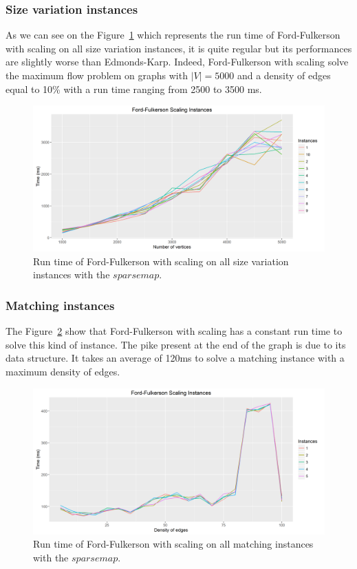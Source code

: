 \subsubsection{Size variation instances}
As we can see on the Figure~\ref{fig:FFmeansize} which represents the run time of Ford-Fulkerson with scaling on all size variation instances, it is quite regular but its performances are slightly worse than Edmonds-Karp. Indeed, Ford-Fulkerson with scaling solve the maximum flow problem on graphs with $|V|=5000$ and a density of edges equal to 10\% with a run time ranging from 2500 to 3500 ms.
\begin{figure}[H]
\begin{center}
\includegraphics[scale=0.5]{images/FFmeansize.png}
\caption{Run time of Ford-Fulkerson with scaling on all size variation instances with the $sparse map$.}
\label{fig:FFmeansize}
\end{center}
\end{figure}
\subsubsection{Matching instances}
The Figure~\ref{fig:ffmatching} show that Ford-Fulkerson with scaling has a constant run time to solve this kind of instance. The pike present at the end of the graph is due to its data structure. It takes an average of 120ms to solve a matching instance with a maximum density of edges.
\begin{figure}[H]
\begin{center}
\includegraphics[scale=0.5]{images/ffmatching.png}
\caption{Run time of Ford-Fulkerson with scaling on all matching instances with the $sparse map$.}
\label{fig:ffmatching}
\end{center}
\end{figure}
